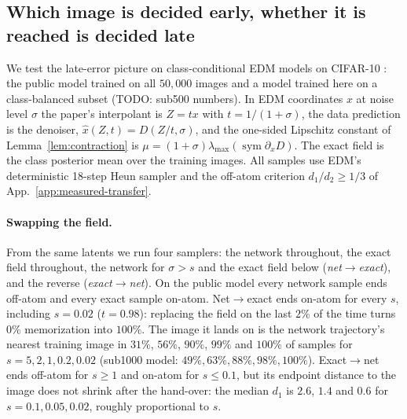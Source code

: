 
\subsection{Which image is decided early, whether it is reached is decided late}
\label{sec:edm-clocks}

We test the late-error picture on class-conditional EDM models on CIFAR-10 \citep{karras2022elucidating}:
the public model trained on all $50{,}000$ images and a model trained here on a class-balanced
subset (TODO: sub500 numbers). In EDM coordinates $x$ at noise level $\sigma$ the paper's
interpolant is $Z=tx$ with $t=1/(1+\sigma)$, the data prediction is the denoiser,
$\hat x(Z,t)=D(Z/t,\sigma)$, and the one-sided Lipschitz constant of
Lemma~\ref{lem:contraction} %
is $\mu=(1+\sigma)\lambda_{\max}(\operatorname{sym}\partial_x D)$. The exact field is the class
posterior mean over the training images. All samples use EDM's deterministic 18-step Heun sampler
and the off-atom criterion $d_1/d_2\ge 1/3$ of App.~\ref{app:measured-transfer}.

\paragraph{Swapping the field.}
From the same latents we run four samplers: the network throughout, the exact field throughout,
the network for $\sigma>s$ and the exact field below (\emph{net$\to$exact}), and the reverse
(\emph{exact$\to$net}). On the public model every network sample ends off-atom and every exact
sample on-atom. Net$\to$exact ends on-atom for every $s$, including $s=0.02$ ($t=0.98$): replacing
the field on the last $2\%$ of the time turns $0\%$ memorization into $100\%$. The image it lands on
is the network trajectory's nearest training image in $31\%$, $56\%$, $90\%$, $99\%$ and $100\%$ of
samples for $s=5,2,1,0.2,0.02$ (sub1000 model: $49\%,63\%,88\%,98\%,100\%$). Exact$\to$net ends
off-atom for $s\ge 1$ and on-atom for $s\le 0.1$, but its endpoint distance to the image does not
shrink after the hand-over: the median $d_1$ is $2.6$, $1.4$ and $0.6$ for $s=0.1,0.05,0.02$,
roughly proportional to $s$.

